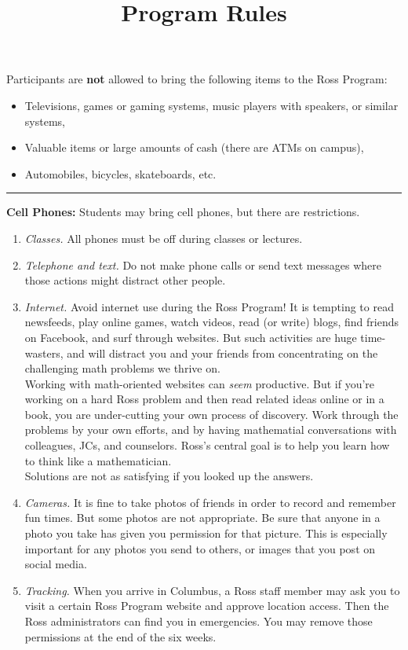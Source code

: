 \documentclass{ross}
\title{Program Rules}
\begin{document}
\maketitle
Participants are {\bf not} allowed to bring the following items to the Ross
Program:
\begin{itemize}
\item Televisions, games or gaming systems, music players with speakers, or similar systems,
\item Valuable items or large amounts of cash (there are ATMs on campus),
\item Automobiles, bicycles, skateboards, etc.
\end{itemize}

\bigskip\hrule
\textbf{Cell Phones:} Students may bring cell phones, but there are restrictions. 
\begin{enumerate}[label=(\roman*),itemsep=0.5em,topsep= 0em]

\item {\it Classes.}  All phones must be off during classes or lectures. 

\item {\it Telephone and text.}  Do not make phone calls or send text messages 
where those actions might distract other people.

\item {\it Internet.} Avoid internet use during the Ross Program! It is tempting to read newsfeeds, play online games, watch videos, read (or write) blogs, find friends on Facebook, and surf through websites.  But such activities are huge time-wasters, and will distract you and your friends from concentrating on the challenging math problems we thrive on.  \\[5pt]
Working with math-oriented websites can {\it seem} productive. But if you're working on a hard Ross problem and then read related ideas online or in a book, you are under-cutting your own process of discovery. Work through the problems by your own efforts, and by having mathematial conversations with colleagues, JCs, and counselors.  Ross's central goal is to help you learn how to think like a mathematician.\\
\hspace*{1cm} Solutions are not as satisfying if you looked up the answers.

\item {\it Cameras.}  It is fine to take photos of friends in order to record and remember fun times.  But some photos are not appropriate.  Be sure that anyone in a photo you take has given you permission for that picture.  This is especially important for any photos you send to others, or images that you post on social media. 

\item{\it Tracking.}  When you arrive in Columbus, a Ross staff member
may ask you to visit a certain Ross Program website and approve
location access.  Then the Ross administrators can find you in
emergencies. You may remove those permissions at the end of the six
weeks.
\end{enumerate}
\end{document}
